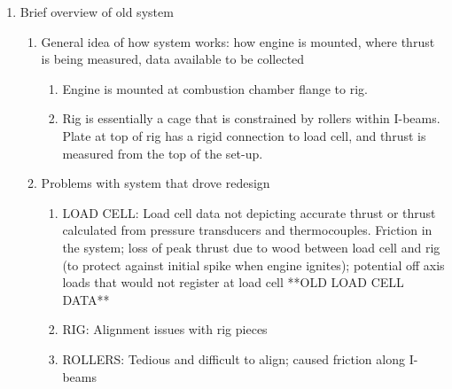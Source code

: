 \documentclass[10pt,a4paper]{article}
\begin{document}
 \begin{enumerate}
 	\item Brief overview of old system
 	\begin{enumerate}
 		\item General idea of how system works: how engine is mounted, where thrust is being measured, data available to be collected
 		\begin{enumerate}
 			\item Engine is mounted at combustion chamber flange to rig.
 			\item Rig is essentially a cage that is constrained by rollers within I-beams. Plate at top of rig has a rigid connection to load cell, and thrust is measured from the top of the set-up.
 		\end{enumerate}
 		\item Problems with system that drove redesign
 		\begin{enumerate}
 			\item LOAD CELL: Load cell data not depicting accurate thrust or thrust calculated from pressure transducers and thermocouples. Friction in the system; loss of peak thrust due to wood between load cell and rig (to protect against initial spike when engine ignites); potential off axis loads that would not register at load cell **OLD LOAD CELL DATA**
 			\item RIG: Alignment issues with rig pieces
 			\item ROLLERS: Tedious and difficult to align; caused friction along I-beams
 		\end{enumerate}
 	\end{enumerate}
 	

\end{enumerate}
\end{document}
